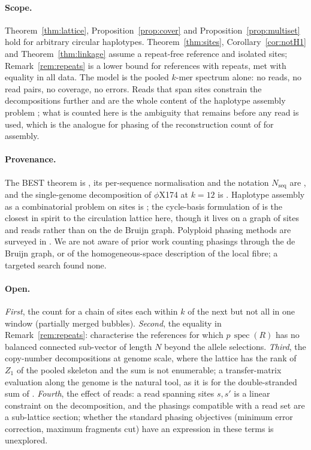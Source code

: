 \documentclass[11pt]{article}
\theoremstyle{plain}
\theoremstyle{definition}
\theoremstyle{remark}
\newcommand{\spec}{\operatorname{spec}}
\newcommand{\Nseq}{N_{\mathrm{seq}}}
\begin{document}
\paragraph{Scope.} Theorem~\ref{thm:lattice}, Proposition~\ref{prop:cover} and
Proposition~\ref{prop:multiset} hold for arbitrary circular haplotypes. Theorem~\ref{thm:sites},
Corollary~\ref{cor:notH1} and Theorem~\ref{thm:linkage} assume a repeat-free reference and
isolated sites; Remark~\ref{rem:repeats} is a lower bound for references with repeats, met with
equality in all data. The model is the pooled $k$-mer spectrum alone: no reads, no read
pairs, no coverage, no errors. Reads that span sites constrain the decompositions further and
are the whole content of the haplotype assembly problem \cite{LBIL01,BB08,AI12}; what is
counted here is the ambiguity that remains before any read is used, which is the analogue for
phasing of the reconstruction count of \cite{KSP} for assembly.

\paragraph{Provenance.} The BEST theorem is \cite{AEdB,SmithTutte}, its per-sequence
normalisation and the notation $\Nseq$ are \cite{Bio8}, and the single-genome decomposition
of $\phi$X174 at $k=12$ is \cite{Bio1}. Haplotype assembly as a combinatorial problem on
sites is \cite{LBIL01}; the cycle-basis formulation of \cite{AI12} is the closest in spirit to
the circulation lattice here, though it lives on a graph of sites and reads rather than on the
de Bruijn graph. Polyploid phasing methods are surveyed in \cite{Garg21}. We are not aware of
prior work counting phasings through the de Bruijn graph, or of the homogeneous-space
description of the local fibre; a targeted search found none.

\paragraph{Open.} \emph{First}, the count for a chain of sites each within $k$ of the next
but not all in one window (partially merged bubbles). \emph{Second}, the equality in
Remark~\ref{rem:repeats}: characterise the references for which $p\,\spec(R)$ has no
balanced connected sub-vector of length $N$ beyond the allele selections. \emph{Third}, the
copy-number decompositions at genome scale, where the lattice has the rank of $Z_1$ of the
pooled skeleton and the sum is not enumerable; a transfer-matrix evaluation along the genome
is the natural tool, as it is for the double-stranded sum of \cite{Bio8}. \emph{Fourth}, the
effect of reads: a read spanning sites $s,s'$ is a linear constraint on the decomposition,
and the phasings compatible with a read set are a sub-lattice section; whether the standard
phasing objectives (minimum error correction, maximum fragments cut) have an expression in
these terms is unexplored.
\end{document}
